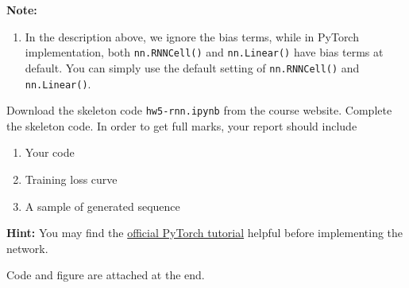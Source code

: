 \documentclass{article}
\begin{document}
\begin{probset}
\begin{prob}
    \textbf{Note:} 
    \begin{enumerate}
        \item In the description above, we ignore the bias terms, while in PyTorch implementation, both \newline\texttt{nn.RNNCell()} and \texttt{nn.Linear()} have bias terms at default. You can simply use the default setting of \texttt{nn.RNNCell()} and \texttt{nn.Linear()}.
    \end{enumerate}

    \newpage

    Download the skeleton code \texttt{hw5-rnn.ipynb} from the course website. Complete the skeleton code. In order to get full marks, your report should include 

    \begin{enumerate}
        \item Your code
        \item Training loss curve
        \item A sample of generated sequence
    \end{enumerate}

    \textbf{Hint:} You may find the \href{https://pytorch.org/tutorials/beginner/deep_learning_60min_blitz.html}{official PyTorch tutorial} helpful before implementing the network.

    \begin{soln}
        Code and figure are attached at the end.
    \end{soln}
\end{prob}
\end{probset}
\end{document}
